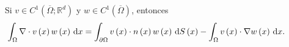 \begin{theorem}
\begin{description}
        \item[]

            Si $v\in C^{1}\left(\overline{\Omega};\mathbb{R}^{d}\right)$ y
            $w\in C^{1}\left(\overline{\Omega}\right)$, entonces
            \begin{equation*}
                \int_{\Omega}\nabla\cdot v\left(x\right)
                w\left(x\right)
                \dl x=
                \int_{\partial\Omega}
                v\left(x\right)\cdot
                n\left(x\right)
                w\left(x\right)
                \dl{S\left(x\right)}-
                \int_{\Omega}
                v\left(x\right)\cdot
                \nabla w\left(x\right)
                \dl x.
            \end{equation*}
    \end{description}
\end{theorem}

